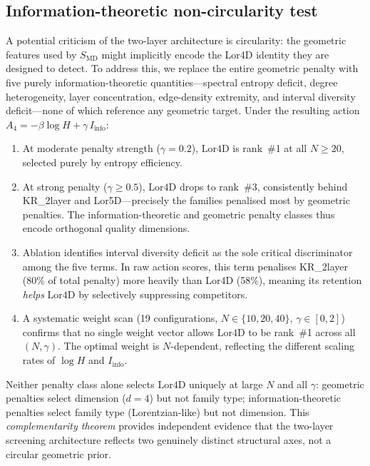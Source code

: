 \documentclass[12pt,a4paper]{article}
\newcommand{\SMD}{S_{\mathrm{MD}}}
\newcommand{\Lor}{\mathrm{Lor4D}}
\begin{document}
\subsection{Information-theoretic non-circularity test}
\label{sec:info-penalty}

A potential criticism of the two-layer architecture is circularity: the geometric
features used by $\SMD$ might implicitly encode the Lor4D identity they are
designed to detect. To address this, we replace the entire geometric penalty
with five purely information-theoretic quantities---spectral entropy deficit,
degree heterogeneity, layer concentration, edge-density extremity, and interval
diversity deficit---none of which reference any geometric target. Under the
resulting action $A_4 = -\beta\log H + \gamma\,I_{\mathrm{info}}$:

\begin{enumerate}
\item At moderate penalty strength ($\gamma=0.2$), $\Lor$ is
  rank~\#1 at all $N\geq 20$, selected purely by entropy efficiency.
\item At strong penalty ($\gamma\geq 0.5$), $\Lor$ drops to
  rank~\#3, consistently behind KR\_2layer and Lor5D---precisely the
  families penalised most by geometric penalties. The information-theoretic
  and geometric penalty classes thus encode orthogonal quality dimensions.
\item Ablation identifies interval diversity deficit as the sole critical
  discriminator among the five terms. In raw action scores, this term
  penalises KR\_2layer (80\% of total penalty) more heavily than $\Lor$
  (58\%), meaning its retention \emph{helps} $\Lor$ by selectively
  suppressing competitors.
\item A systematic weight scan (19 configurations, $N\in\{10,20,40\}$,
  $\gamma\in[0,2]$) confirms that no single weight vector allows $\Lor$ to
  be rank~\#1 across all $(N,\gamma)$. The optimal weight is $N$-dependent,
  reflecting the different scaling rates of $\log H$ and $I_{\mathrm{info}}$.
\end{enumerate}

\noindent
Neither penalty class alone selects $\Lor$ uniquely at large $N$ and all
$\gamma$: geometric penalties select dimension ($d=4$) but not family type;
information-theoretic penalties select family type (Lorentzian-like) but not
dimension. This \emph{complementarity theorem} provides independent evidence
that the two-layer screening architecture reflects two genuinely distinct
structural axes, not a circular geometric prior.
\end{document}
